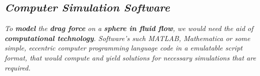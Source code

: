             
            
            
            
            
            
            
            
            
            
            
\subsection{\textit{Computer Simulation Software}}
        
    \textit{To \textbf{model} the \textbf{drag force} on a \textbf{sphere in fluid flow}, we would need the aid of \textbf{computational technology}. Software's such MATLAB, Mathematica or some simple, eccentric computer programming language code in a emulatable script format, that would compute and yield solutions for necessary simulations that are required.}
    
        
        


